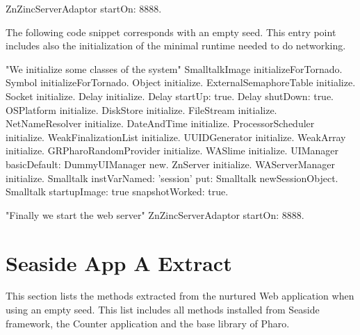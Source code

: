 \begin{code}
	ZnZincServerAdaptor startOn: 8888.
\end{code}

The following code snippet corresponds with an empty seed.  This entry point includes also the initialization of the minimal runtime needed to do networking.

\begin{code}
	"We initialize some classes of the system"
	SmalltalkImage initializeForTornado.
	Symbol initializeForTornado.
	Object initialize.
	ExternalSemaphoreTable initialize.
	Socket initialize.
	Delay initialize.
	Delay startUp: true.
	Delay shutDown: true.
	OSPlatform initialize.
	DiskStore initialize.
	FileStream initialize.
	NetNameResolver initialize.
	DateAndTime initialize.
	ProcessorScheduler initialize.
	WeakFinalizationList initialize.
	UUIDGenerator initialize.
	WeakArray initialize.
	GRPharoRandomProvider initialize.
	WASlime initialize.
	UIManager basicDefault: DummyUIManager new.
	ZnServer initialize.
	WAServerManager initialize.
	Smalltalk instVarNamed: 'session' put: Smalltalk newSessionObject.
	Smalltalk startupImage: true snapshotWorked: true.
	
	"Finally we start the web server"
	ZnZincServerAdaptor startOn: 8888.
\end{code}

\section{Seaside App A Extract} \label{app:extraction_seaside_empty_seed}

This section lists the methods extracted from the nurtured Web application when using an empty seed. This list includes all methods installed from Seaside framework, the Counter application and the base library of Pharo.

